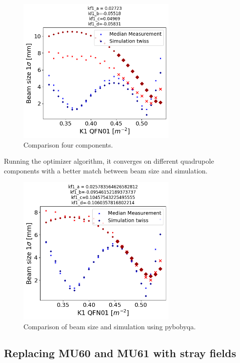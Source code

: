 \begin{figure}[H]
\centering
\includegraphics[width=0.7\textwidth]{02_Simulation/images/comparison_sim_meas_four_compo.png}
\caption{Comparison four components.}
\label{fig:comparison_four_compo}
\end{figure}

Running the optimizer algorithm, it converges on different quadrupole components with a better match between beam size and simulation.

\begin{figure}[H]
\centering
\includegraphics[width=0.7\textwidth]{02_Simulation/images/comparison_sim_meas_bobyqa.png}
\caption{Comparison of beam size and simulation using pybobyqa.}
\label{fig:comparison_bobyqa}
\end{figure}

\subsection{Replacing MU60 and MU61 with stray fields}

